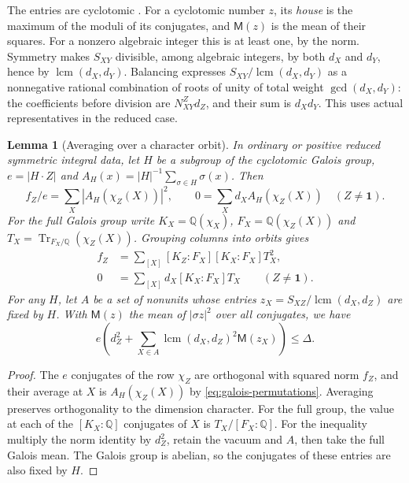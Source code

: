 \documentclass[11pt,a4paper]{article}
\numberwithin{equation}{section}
\newtheorem{lemma}[theorem]{Lemma}
\theoremstyle{remark}
\newcommand{\one}{\mathbf1}
\newcommand{\QQ}{\mathbb Q}
\newcommand{\Tr}{\operatorname{Tr}}
\newcommand{\lcm}{\operatorname{lcm}}
\begin{document}
The entries are cyclotomic \cite[Theorem~8.51]{ENOannals}. For a cyclotomic
number $z$, its \emph{house} is the maximum of the moduli of its conjugates, and $\mathsf M(z)$ is the mean of their squares.
For a nonzero algebraic integer this is at least one, by the norm.
Symmetry makes $S_{XY}$ divisible, among algebraic integers, by both $d_X$
and $d_Y$, hence by $\lcm(d_X,d_Y)$.
Balancing expresses $S_{XY}/\lcm(d_X,d_Y)$ as a nonnegative rational
combination of roots of unity of total weight $\gcd(d_X,d_Y)$:
the coefficients before division are $N_{XY}^Z d_Z$, and their sum is $d_Xd_Y$.
This uses actual representatives in the reduced case.

\begin{lemma}[Averaging over a character orbit]\label{deep:field-energy}
In ordinary or positive reduced symmetric integral data, let $H$ be a subgroup of the cyclotomic Galois group, $e=|H\cdot Z|$ and $A_H(x)=|H|^{-1}\sum_{\sigma\in H}\sigma(x)$. Then
\[
  f_Z/e=\sum_X |A_H(\chi_Z(X))|^2,\qquad
  0=\sum_X d_X A_H(\chi_Z(X))\quad (Z\ne\one).
\]
For the full Galois group write $K_X=\QQ(\chi_X)$, $F_X=\QQ(\chi_Z(X))$ and $T_X=\Tr_{F_X/\QQ}(\chi_Z(X))$. Grouping columns into orbits gives
\begin{align}
 f_Z&=\sum_{[X]}[K_Z:F_X][K_X:F_X]T_X^2,\label{eq:r8-tracenorm}\\
 0&=\sum_{[X]}d_X[K_X:F_X]T_X\qquad(Z\ne\one).\label{eq:r8-tracedim}
\end{align}
For any $H$, let $A$ be a set of nonunits whose entries $z_X=S_{XZ}/\lcm(d_X,d_Z)$ are fixed by $H$. With $\mathsf M(z)$ the mean of $|\sigma z|^2$ over all conjugates, we have
\[
 e\left(d_Z^2+\sum_{X\in A}\lcm(d_X,d_Z)^2\mathsf M(z_X)\right)\le\Delta .
\]
\end{lemma}
\begin{proof}
The $e$ conjugates of the row $\chi_Z$ are orthogonal with squared norm $f_Z$, and their average at $X$ is $A_H(\chi_Z(X))$ by \eqref{eq:galois-permutations}. Averaging preserves orthogonality to the dimension character. For the full group, the value at each of the $[K_X:\QQ]$ conjugates of $X$ is $T_X/[F_X:\QQ]$. For the inequality multiply the norm identity by $d_Z^2$, retain the vacuum and $A$, then take the full Galois mean. The Galois group is abelian, so the conjugates of these entries are also fixed by $H$.
\end{proof}
\end{document}
